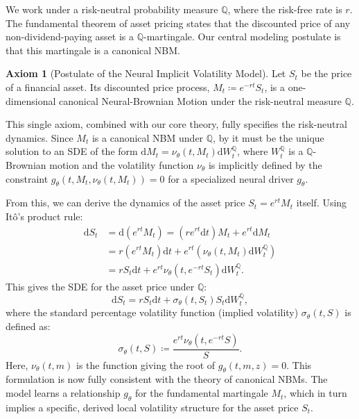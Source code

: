 \documentclass[qian]{imsart}
\newcommand{\Qbb}{\mathbb{Q}}
\newcommand{\dd}{\mathrm{d}}
\theoremstyle{plain}
\theoremstyle{definition}
\newtheorem{axiom}[theorem]{Axiom}
\begin{document}
We work under a risk-neutral probability measure $\Qbb$, where the risk-free rate is $r$. The fundamental theorem of asset pricing states that the discounted price of any non-dividend-paying asset is a $\Qbb$-martingale. Our central modeling postulate is that this martingale is a canonical NBM.

\begin{axiom}[Postulate of the Neural Implicit Volatility Model]
\label{ax:niv_model}
Let $S_t$ be the price of a financial asset. Its discounted price process, $M_t \coloneqq e^{-rt}S_t$, is a one-dimensional canonical Neural-Brownian Motion under the risk-neutral measure $\Qbb$.
\end{axiom}

This single axiom, combined with our core theory, fully specifies the risk-neutral dynamics. Since $M_t$ is a canonical NBM under $\Qbb$, by  it must be the unique solution to an SDE of the form $\dd M_t = \nu_\theta(t, M_t) \dd W_t^\Qbb$, where $W_t^\Qbb$ is a $\Qbb$-Brownian motion and the volatility function $\nu_\theta$ is implicitly defined by the constraint $g_\theta(t, M_t, \nu_\theta(t, M_t)) = 0$ for a specialized neural driver $g_\theta$.

From this, we can derive the dynamics of the asset price $S_t = e^{rt}M_t$ itself. Using Itô's product rule:
\begin{align*}
    \dd S_t &= \dd(e^{rt}M_t) = (r e^{rt} \dd t) M_t + e^{rt} \dd M_t \\
    &= r (e^{rt} M_t) \dd t + e^{rt} \left( \nu_\theta(t, M_t) \dd W_t^\Qbb \right) \\
    &= r S_t \dd t + e^{rt} \nu_\theta(t, e^{-rt}S_t) \dd W_t^\Qbb.
\end{align*}
This gives the SDE for the asset price under $\Qbb$:
\begin{equation}
\label{eq:neural_gbm}
    \dd S_t = r S_t \dd t + \sigma_\theta(t, S_t) S_t \dd W_t^\Qbb,
\end{equation}
where the standard percentage volatility function (implied volatility) $\sigma_\theta(t,S)$ is defined as:
\begin{equation}
\label{eq:implicit_vol_finance}
    \sigma_\theta(t, S) \coloneqq \frac{e^{rt}\nu_\theta(t, e^{-rt}S)}{S}.
\end{equation}
Here, $\nu_\theta(t,m)$ is the function giving the root of $g_\theta(t,m,z)=0$. This formulation is now fully consistent with the theory of canonical NBMs. The model learns a relationship $g_\theta$ for the fundamental martingale $M_t$, which in turn implies a specific, derived local volatility structure for the asset price $S_t$.
\end{document}
